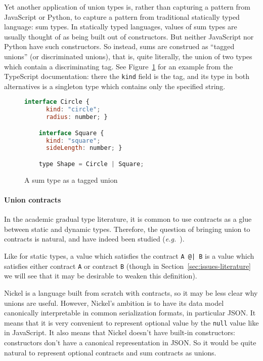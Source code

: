 \documentclass[sigplan,screen,10pt]{acmart}
\newcommand{\nickel}[1]{\lstinline[language=nickel]{#1}}
\newcommand{\typescript}[1]{\lstinline[language=JavaScript]{#1}}
\begin{document}
Yet another application of union types is, rather than capturing a
pattern from JavaScript or Python, to capture a pattern from
traditional statically typed language: sum types. In statically typed
languages, values of sum types are usually thought of as being built
out of constructors. But neither JavaScript nor Python have such
constructors. So instead, sums are construed as ``tagged unions'' (or
discriminated unions), that is, quite literally, the union of two
types which contain a discriminating tag. See
Figure~\ref{fig:tagged-union} for an example from the TypeScript
documentation: there the \typescript{kind} field is the tag, and its
type in both alternatives is a singleton type which contains only the
specified string.

\begin{figure}
  \centering
  \begin{lstlisting}[language=JavaScript]
    interface Circle {
      kind: "circle";
      radius: number; }

    interface Square {
      kind: "square";
      sideLength: number; }

    type Shape = Circle | Square;
\end{lstlisting}

  \caption{A sum type as a tagged union}
  \label{fig:tagged-union}
\end{figure}

\paragraph{Union contracts}

In the academic gradual type literature, it is common to use contracts
as a glue between static and dynamic types. Therefore, the question of
bringing union to contracts is natural, and have indeed been studied
(\emph{e.g.}~\cite{KeilThiemannUnionIntersection,RootCauseOfBlame}).

Like for static types, a value which satisfies the contract \nickel{A @| B}
is a value which satisfies either contract \nickel{A} or
contract \nickel{B} (though in Section~\ref{sec:issues-literature} we
will see that it may be desirable to weaken this definition).

Nickel is a language built from scratch with contracts, so it may be
less clear why unions are useful. However, Nickel's ambition is to
have its data model canonically interpretable in common serialization
formats, in particular JSON. It means that it is very convenient to
represent optional value by the \nickel{null} value like in
JavaScript. It also means that Nickel doesn't have built-in
constructors: constructors don't have a canonical representation in
JSON. So it would be quite natural to represent optional contracts and
sum contracts as unions.
\end{document}
